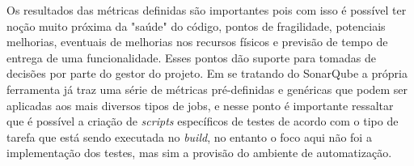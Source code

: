 Os resultados das métricas definidas são importantes pois com isso é possível ter noção muito próxima da "saúde" do código, pontos de fragilidade, potenciais melhorias, eventuais de melhorias nos recursos físicos e previsão de tempo de entrega de uma funcionalidade. Esses pontos dão suporte para tomadas de decisões por parte do gestor do projeto. Em se tratando do SonarQube a própria ferramenta já traz uma série de métricas pré-definidas e genéricas que podem ser aplicadas aos mais diversos tipos de jobs, e nesse ponto é importante ressaltar que é possível a criação de \textit{scripts} específicos de testes de acordo com o tipo de tarefa que está sendo executada no \textit{build}, no entanto o foco aqui não foi a implementação dos testes, mas sim a provisão do ambiente de automatização.
